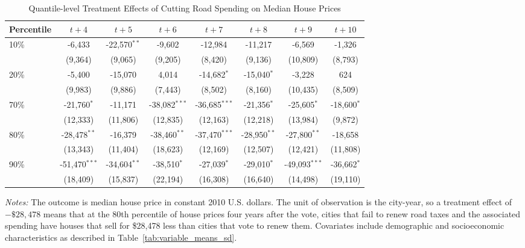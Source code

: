 \begin{table}[ht]
    \centering
    \caption{Quantile-level Treatment Effects of Cutting Road Spending on Median House Prices}
    \label{tab:quantile_tes}
    \begin{threeparttable}
    \begin{minipage}{\linewidth}
    \centering
    \begin{tabular}{p{1.5cm}ccccccc}
        \hline
        Percentile & $t + 4$ & $t + 5$ & $t + 6$ & $t + 7$ & $t + 8$ & $t + 9$ & $t + 10$ \\
        \hline
        10\% & -6,433 & -22,570$^{**}$ & -9,602 & -12,984 & -11,217 & -6,569 & -1,326 \\
             & (9,364) & (9,065) & (9,205) & (8,420) & (9,136) & (10,809) & (8,793) \\
        20\% & -5,400 & -15,070 & 4,014 & -14,682$^{*}$ & -15,040$^{*}$ & -3,228 & 624 \\
             & (9,983) & (9,886) & (7,443) & (8,502) & (8,160) & (10,435) & (8,509) \\
        70\% & -21,760$^{*}$ & -11,171 & -38,082$^{***}$ & -36,685$^{***}$ & -21,356$^{*}$ & -25,605$^{*}$ & -18,600$^{*}$ \\
             & (12,333) & (11,806) & (12,835) & (12,163) & (12,218) & (13,984) & (9,872) \\
        80\% & -28,478$^{**}$ & -16,379 & -38,460$^{**}$ & -37,470$^{***}$ & -28,950$^{**}$ & -27,800$^{**}$ & -18,658 \\
             & (13,343) & (11,404) & (18,623) & (12,169) & (12,507) & (12,421) & (11,808) \\
        90\% & -51,470$^{***}$ & -34,604$^{**}$ & -38,510$^{*}$ & -27,039$^{*}$ & -29,010$^{*}$ & -49,093$^{***}$ & -36,662$^{*}$ \\
             & (18,409) & (15,837) & (22,194) & (16,308) & (16,640) & (14,498) & (19,110) \\
        \hline
    \end{tabular}
    \vspace{0.5em}
    \begin{tablenotes}[flushleft]
        \small
        \item \textit{Notes:} The outcome is median house price in constant 2010 U.S. dollars. The unit of observation is the city-year, so a treatment effect of \(-\$28{,}478\) means that at the 80th percentile of house prices four years after the vote, cities that fail to renew road taxes and the associated spending have houses that sell for \$28,478 less than cities that vote to renew them. Covariates include demographic and socioeconomic characteristics as described in Table~\ref{tab:variable_means_sd}.
    \end{tablenotes}
    \end{minipage}
    \end{threeparttable}
\end{table}


